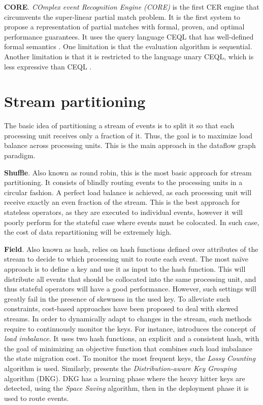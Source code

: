 \textbf{CORE}. \emph{COmplex event Recognition Engine (CORE)} \cite{core} is the first CER engine that circumvents the super-linear partial match problem. It is the first system to propose a representation of partial matches with formal, proven, and optimal performance guarantees. It uses the query language CEQL that has well-defined formal semantics \cite{on-the-expressiveness}. One limitation is that the evaluation algorithm is sequential. Another limitation is that it is restricted to the language unary CEQL, which is less expressive than CEQL \cite{on-the-expressiveness}.

\section{Stream partitioning}\label{sec:stream-partitioning}

The basic idea of partitioning a stream of events is to split it so that each processing unit receives only a fraction of it. Thus, the goal is to maximize load balance across processing units. This is the main approach in the dataflow graph paradigm.

\textbf{Shuffle}. Also known as round robin, this is the most basic approach for stream partitioning. It consists of blindly routing events to the processing units in a circular fashion. A perfect load balance is achieved, as each processing unit will receive exactly an even fraction of the stream. This is the best approach for stateless operators, as they are executed to individual events, however it will poorly perform for the stateful case where events must be colocated. In such case, the cost of data repartitioning will be extremely high.

\textbf{Field}. Also known as hash, relies on hash functions defined over attributes of the stream to decide to which processing unit to route each event. The most na\"ive approach is to define a key and use it as input to the hash function. This will distribute all events that should be collocated into the same processing unit, and thus stateful operators will have a good performance. However, such settings will greatly fail in the presence of skewness in the used key. To alleviate such constraints, cost-based approaches have been proposed to deal with skewed streams. In order to dynamically adapt to changes in the stream, such methods require to continuously monitor the keys. For instance, \cite{DBLP:journals/vldb/Gedik14} introduces the concept of \textit{load imbalance}. It uses two hash functions, an explicit and a consistent hash, with the goal of minimizing an objective function that combines such load imbalance the state migration cost. To monitor the most frequent keys, the \textit{Lossy Counting} algorithm is used. Similarly, \cite{DBLP:conf/debs/RivettiQABS15} presents the \textit{Distribution-aware Key Grouping} algorithm (DKG). DKG has a learning phase where the heavy hitter keys are detected, using the \textit{Space Saving} algorithm, then in the deployment phase it is used to route events.

